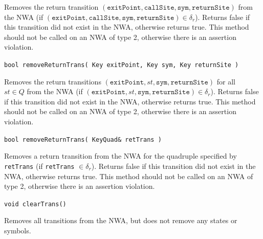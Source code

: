 \documentclass{llncs}
\begin{document}
\begin{description}
    Removes the return transition
    $(\texttt{exitPoint},\texttt{callSite},\texttt{sym},\texttt{returnSite})$
    from the NWA (if
    $(\texttt{exitPoint},\texttt{callSite},\texttt{sym},\texttt{returnSite})
    \in \delta_r$).  Returns false if this transition did not exist in the
    NWA, otherwise returns true.  This method should not be called on an NWA
    of type 2, otherwise there is an assertion violation.

  \item\texttt{bool removeReturnTrans( Key exitPoint, Key sym, Key returnSite )} \nopagebreak

    Removes the return transitions
    $(\texttt{exitPoint},st,\texttt{sym},\texttt{returnSite})$ for all \\$st
    \in Q$ from the NWA (if
    $(\texttt{exitPoint},st,\texttt{sym},\texttt{returnSite}) \in \delta_r$).
    Returns false if this transition did not exist in the NWA, otherwise
    returns true.  This method should not be called on an NWA of type 2,
    otherwise there is an assertion violation.

  \item\texttt{bool removeReturnTrans( KeyQuad\& retTrans )} \nopagebreak

    Removes a return transition from the NWA for the quadruple specified by
    \texttt{retTrans} (if \texttt{retTrans} $\in \delta_r$).  Returns false
    if this transition did not exist in the NWA, otherwise returns true.
    This method should not be called on an NWA of type 2, otherwise there is
    an assertion violation.

  \item\texttt{void clearTrans()} \nopagebreak

    Removes all transitions from the NWA, but does not remove any states or
    symbols. \\

\end{description}
\end{document}
